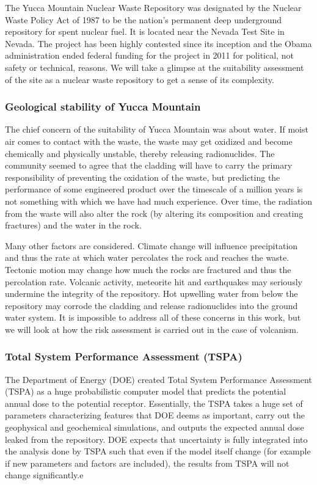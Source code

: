 \documentclass[nofootinbib,preprint,aps]{revtex4-1}
\begin{document}
        The Yucca Mountain Nuclear Waste Repository was designated by the Nuclear Waste Policy Act
        of 1987 to be the nation's permanent deep underground repository for spent nuclear fuel. It is
        located near the Nevada Test Site in Nevada. The project has been highly contested since its
        inception and the Obama administration ended federal funding for the project in 2011 for political,
        not safety or technical, reasons. We will take a glimpse at the suitability assessment of the site
        as a nuclear waste repository to get a sense of its complexity.
        \subsubsection{Geological stability of Yucca Mountain}
        The chief concern of the suitability of Yucca Mountain was about water. If moist air comes to
        contact with the waste, the waste may get oxidized and become chemically and physically unstable, thereby
        releasing radionuclides.
        The community seemed to agree that the cladding will have to carry the primary
        responsibility of preventing the oxidation of the waste, but predicting the performance of some
        engineered product over the timescale of a million years is not something with which we have had much 
        experience. Over time, the radiation from the waste will also alter the rock (by altering its composition
        and creating fractures) and the water in the rock.\cite{m06}

        Many other factors are considered. Climate change will influence precipitation and thus the
        rate at which water percolates the rock and reaches the waste. 
        Tectonic motion may change how much the rocks are fractured and thus the percolation rate.
        Volcanic activity, meteorite hit and earthquakes may seriously undermine the integrity of the repository.
        Hot upwelling water from below the repository may corrode the cladding and release radionuclides into
        the ground water system. It is impossible to address all of these concerns in this work, but we will look
        at how the risk assessment is carried out in the case of volcanism.
        \subsubsection{Total System Performance Assessment (TSPA)}
        The Department of Energy (DOE) created Total System Performance Assessment (TSPA) as a huge probabilistic
        computer model that predicts the potential annual dose to the potential receptor.
        Essentially, the TSPA takes a huge set of parameters characterizing features that DOE deems as important,
        carry out the geophysical and geochemical simulations,
        and outputs the expected annual dose leaked from the repository.
        DOE expects that
        uncertainty is fully integrated into the analysis done by TSPA such that even if the model itself change
        (for example if new parameters and factors are included), the results from TSPA will not change
        significantly.e\cite{cv14,ocrwm02} 
\end{document}
